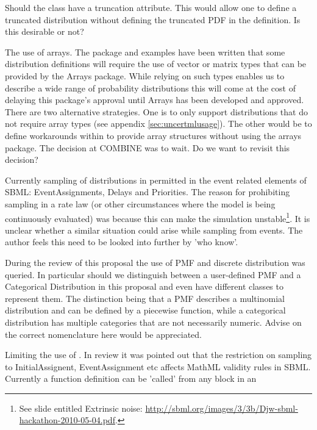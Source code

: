 \documentclass[draftspec]{sbmlpkgspec}
\begin{document}
\begin{description}
\item Should the  class have a truncation
  attribute. This would allow one to define a truncated distribution
  without defining the truncated PDF in the \mathml definition. Is
  this desirable or not?
\item The use of arrays. The package and examples have been written
  that some distribution definitions will require the use of vector or
  matrix types that can be provided by the Arrays package. While
  relying on such types enables us to describe a wide range of
  probability distributions this will come at the cost of delaying
  this package's approval until Arrays has been developed and
  approved. There are two alternative strategies. One is to only
  support distributions that do not require array types (see appendix
  \ref{sec:uncertmlusage}). The other would be to define workarounds
  within \distribshort to provide array structures without using the
  arrays package. The decision at COMBINE was to wait. Do we want to
  revisit this decision?
\item Currently sampling of distributions in permitted in the event
  related elements of SBML: EventAssignments, Delays and
Priorities. The reason for prohibiting sampling in a rate law (or other
circumstances where the model is being continuously evaluated) was
because this can make the simulation unstable\footnote{See slide entitled Extrinsic
  noise:
  \url{http://sbml.org/images/3/3b/Djw-sbml-hackathon-2010-05-04.pdf}.}. It
is unclear whether a similar situation could arise while sampling from
events. The author feels this need to be looked into further by 'who know'.
\item During the review of this proposal the use of PMF and discrete
  distribution was queried. In particular should we distinguish
  between a user-defined PMF and a Categorical Distribution in this
  proposal and even have different classes to represent them. The
  distinction being that a PMF describes a multinomial distribution
  and can be defined by a piecewise function, while a categorical
  distribution has multiple categories that are not necessarily
  numeric. Advise on the correct nomenclature here would be
  appreciated.
\item Limiting the use of . In review it was
  pointed out that the restriction on sampling to InitialAssignent,
  EventAssignment etc affects MathML validity rules in SBML. Currently
  a function definition can be 'called' from any \mathml block in an

\end{description}
\end{document}
